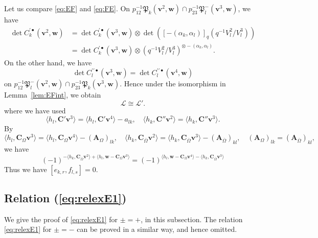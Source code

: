 \documentclass[12pt]{amsart}
\def\frak{\mathfrak}
\theoremstyle{definition}
\theoremstyle{remark}
\numberwithin{equation}{subsection}
\newcommand{\lemref}[1]{Lemma~\ref{#1}}
\newcommand{\bv}{{\mathbf v}} %
\newcommand{\bw}{{\mathbf w}} %
\newcommand{\bC}{{\mathbf C}} %
\newcommand{\bA}{{\mathbf A}} %
\newcommand{\Pa}{{\frak P}} %
\begin{document}
Let us compare \eqref{eq:EF} and \eqref{eq:FE}.
On $p_{12}^{-1}\Pa_k(\bv^2,\bw) \cap p_{23}^{-1}\Pa^-_{l}(\bv^3,\bw)$,
we have
\begin{equation*}
\begin{split}
  \det C_k^{\prime\bullet}(\bv^2,\bw)
  & = \det C_k^{\prime\bullet}(\bv^3,\bw)
  \otimes\det\left([-(\alpha_k,\alpha_l)]_q (q^{-1}V^2_l/V^3_l)\right) \\
  & = \det C_k^{\prime\bullet}(\bv^3,\bw)
  \otimes \left(q^{-1}V^2_l/V^3_l\right)^{\otimes -(\alpha_k,\alpha_l)}.
\end{split}
\end{equation*}
On the other hand, we have
\begin{equation*}
  \det C_l^{\prime\prime\bullet}(\bv^3,\bw)
  = \det C_l^{\prime\prime\bullet}(\bv^4,\bw)
\end{equation*}
on $p_{12}^{-1}\Pa^-_l(\bv^2,\bw) \cap p_{23}^{-1}\Pa_{k}(\bv^3,\bw)$.
Hence under the isomorphism in \lemref{lem:EFint}, we obtain
\begin{equation*}
  \mathcal L \cong \mathcal L'.
\end{equation*}
where we have used
\begin{equation}\label{eq:EF_FE_data}
 \langle h_l, \bC'\bv^3\rangle
= \langle h_l, \bC'\bv^4\rangle - a_{lk},
\quad
 \langle h_k, \bC''\bv^2\rangle 
= \langle h_k, \bC''\bv^3\rangle.
\end{equation}
By
\begin{equation*}
 \langle h_l, \bC_\Omega\bv^3\rangle
= \langle h_l, \bC_\Omega\bv^4\rangle - (\bA_\Omega)_{lk},
\quad
 \langle h_k, \bC_{\overline\Omega}\bv^2\rangle
= \langle h_k, \bC_{\overline\Omega}\bv^3\rangle
   - (\bA_{\overline\Omega})_{kl},
\quad
 (\bA_\Omega)_{lk} = (\bA_{\overline\Omega})_{kl},
\end{equation*}
we have
\begin{equation*}
   (-1)^{-\langle h_k, \bC_{\overline\Omega}\bv^2\rangle
          +\langle h_l, \bw-\bC_\Omega\bv^3\rangle}
   = 
   (-1)^{\langle h_l, \bw-\bC_\Omega\bv^4\rangle
         -\langle h_k, \bC_{\overline\Omega}\bv^3\rangle}
\end{equation*}
Thus we have $[e_{k,r}, f_{l,s}] = 0$.

\subsection{Relation (\ref{eq:relexE1})}
We give the proof of \eqref{eq:relexE1} for $\pm = +$, in this
subsection. The relation \eqref{eq:relexE1} for $\pm = -$ can be
proved in a similar way, and hence omitted.
\end{document}
